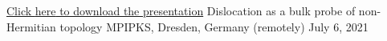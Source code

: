 \begin{cventries}
  \cventry
	{\href{https://drive.google.com/file/d/18EtxINc68yc_Dt_sxsVkAIQNs8viJxYq/view?usp=sharing}{Click \underline{here} to download the presentation}} %
	{Dislocation as a bulk probe of non-Hermitian topology} %
	{MPIPKS, Dresden, Germany (remotely)} %
	{July 6, 2021} %
	{
	}
\end{cventries}
